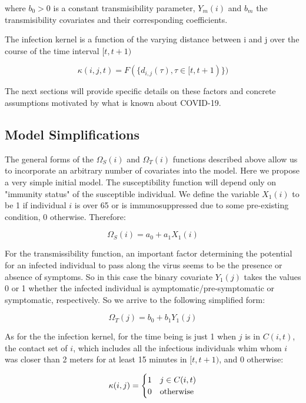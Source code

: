 \documentclass{article}
\begin{document}
where $b_0>0$ is a constant transmisibility parameter, $Y_{m}(i)$ and $b_{m}$ the transmisibility covariates and their corresponding coefficients.

The infection kernel is a function of the varying distance between i and j over the course of the time interval $[t, t + 1)$

\begin{equation}
\kappa(i, j, t)=F(\{d_{i,j}(\tau), \tau \in [t, t+1)\})
\end{equation}

The next sections will provide specific details on these factors and concrete assumptions motivated by what is known about COVID-19.

\subsection{Model Simplifications}

The general forms of the $\Omega_{S}(i)$ and $\Omega_{T}(i)$ functions described above allow us to incorporate an arbitrary number of covariates into the model. Here we propose a very simple initial model. The susceptibility function will depend only on "immunity status" of the susceptible individual. We define the variable $X_1(i)$ to be 1 if individual $i$ is over 65 or is immunosuppressed due to some pre-existing condition, 0 otherwise.  Therefore:

\begin{equation}
\Omega_{S}(i)=a_0 + a_1 X_1(i)
\end{equation}

For the transmissibility function, an important factor determining the potential for an infected individual to pass along the virus seems to be the presence or absence of symptoms. So in this case the binary covariate $Y_1(j)$ takes the values 0 or 1 whether the infected individual is aymptomatic/pre-symptomatic or symptomatic, respectively. So we arrive to the following simplified form:

\begin{equation}
\Omega_{T}(j)=b_0 + b_1 Y_1(j)
\end{equation}

As for the the infection kernel, for the time being is just 1 when $j$ is in $C(i, t)$, the contact set of $i$, which includes all the infectious individuals whim whom $i$ was closer than 2 meters for at least 15 minutes in $[t, t+1)$, and 0 otherwise:

\begin{equation}
\kappa(i, j)=\begin{cases} 
                1 & j \in C(i, t) \\
                0 & $otherwise$ 
             \end{cases}
\end{equation}
\end{document}
